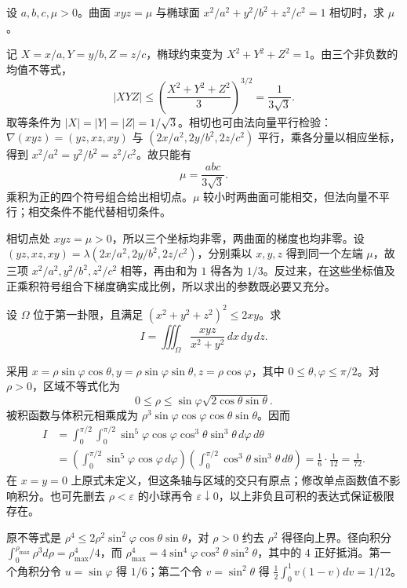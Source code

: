 \documentclass[UTF8,12pt,a4paper,fontset=fandol]{ctexart}
\begin{document}
\begin{example}\label{nm-2019-1e}
设 $a,b,c,\mu>0$。曲面 $xyz=\mu$ 与椭球面 $x^2/a^2+y^2/b^2+z^2/c^2=1$ 相切时，求 $\mu$。
\end{example}
\begin{solve}
记 $X=x/a,Y=y/b,Z=z/c$，椭球约束变为 $X^2+Y^2+Z^2=1$。由三个非负数的均值不等式，
\[
 |XYZ|\leq\left(\frac{X^2+Y^2+Z^2}{3}\right)^{3/2}
 =\frac1{3\sqrt3}.
\]
取等条件为 $|X|=|Y|=|Z|=1/\sqrt3$。相切也可由法向量平行检验：$\nabla(xyz)=(yz,xz,xy)$ 与 $(2x/a^2,2y/b^2,2z/c^2)$ 平行，乘各分量以相应坐标，得到 $x^2/a^2=y^2/b^2=z^2/c^2$。故只能有
\[
 \mu=\frac{abc}{3\sqrt3}.
\]
乘积为正的四个符号组合给出相切点。$\mu$ 较小时两曲面可能相交，但法向量不平行；相交条件不能代替相切条件。

相切点处 $xyz=\mu>0$，所以三个坐标均非零，两曲面的梯度也均非零。设 $(yz,xz,xy)=\lambda(2x/a^2,2y/b^2,2z/c^2)$，分别乘以 $x,y,z$ 得到同一个左端 $\mu$，故三项 $x^2/a^2,y^2/b^2,z^2/c^2$ 相等，再由和为 $1$ 得各为 $1/3$。反过来，在这些坐标值及正乘积符号组合下梯度确实成比例，所以求出的参数既必要又充分。

\end{solve}

\begin{example}\label{nm-2019-2}
设 $\Omega$ 位于第一卦限，且满足 $(x^2+y^2+z^2)^2\leq2xy$。求
\[
 I=\iiint_\Omega\frac{xyz}{x^2+y^2}\,dx\,dy\,dz.
\]
\end{example}
\begin{solve}
采用 $x=\rho\sin\varphi\cos\theta,y=\rho\sin\varphi\sin\theta,z=\rho\cos\varphi$，其中 $0\leq\theta,\varphi\leq\pi/2$。对 $\rho>0$，区域不等式化为
\[
 0\leq\rho\leq\sin\varphi\sqrt{2\cos\theta\sin\theta}.
\]
被积函数与体积元相乘成为 $\rho^3\sin\varphi\cos\varphi\cos\theta\sin\theta$。因而
\begin{align*}
 I&=\int_0^{\pi/2}\int_0^{\pi/2}
 \sin^5\varphi\cos\varphi\cos^3\theta\sin^3\theta\,d\varphi\,d\theta\\
 &=\left(\int_0^{\pi/2}\sin^5\varphi\cos\varphi\,d\varphi\right)
 \left(\int_0^{\pi/2}\cos^3\theta\sin^3\theta\,d\theta\right)
 =\frac16\cdot\frac1{12}=\frac1{72}.
\end{align*}
在 $x=y=0$ 上原式未定义，但这条轴与区域的交只有原点；修改单点函数值不影响积分。也可先删去 $\rho<\varepsilon$ 的小球再令 $\varepsilon\downarrow0$，以上非负且可积的表达式保证极限存在。

原不等式是 $\rho^4\le2\rho^2\sin^2\varphi\cos\theta\sin\theta$，对 $\rho>0$ 约去 $\rho^2$ 得径向上界。径向积分 $\int_0^{\rho_{\max}}\rho^3d\rho=\rho_{\max}^4/4$，而 $\rho_{\max}^4=4\sin^4\varphi\cos^2\theta\sin^2\theta$，其中的 $4$ 正好抵消。第一个角积分令 $u=\sin\varphi$ 得 $1/6$；第二个令 $v=\sin^2\theta$ 得 $\tfrac12\int_0^1v(1-v)dv=1/12$。

\end{solve}
\end{document}
